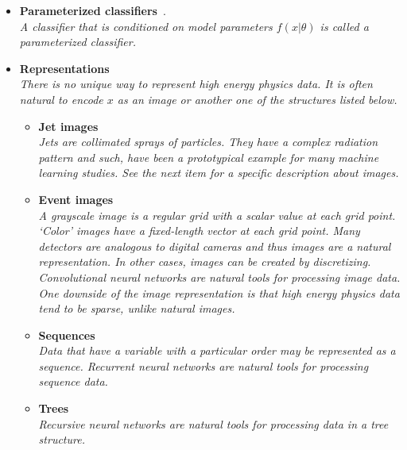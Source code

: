 \documentclass[12pt,letterpaper]{article}
\begin{document}
\begin{itemize}
	\begin{itemize}
		\item \textbf{Parameterized classifiers}~\cite{Baldi:2016fzo,Cranmer:2015bka,Nachman:2021yvi}.
			\\\textit{A classifier that is conditioned on model parameters $f(x|\theta)$ is called a parameterized classifier.}
		\item \textbf{Representations}
			\\\textit{There is no unique way to represent high energy physics data.  It is often natural to encode $x$ as an image or another one of the structures listed below.}
			\begin{itemize}
				\item \textbf{Jet images}~\cite{Pumplin:1991kc,Cogan:2014oua,Almeida:2015jua,deOliveira:2015xxd,ATL-PHYS-PUB-2017-017,Lin:2018cin,Komiske:2018oaa,Barnard:2016qma,Komiske:2016rsd,Kasieczka:2017nvn,Macaluso:2018tck,li2020reconstructing,li2020attention,Lee:2019cad,collado2021learning,Du:2020pmp,Filipek:2021qbe}
				\\\textit{Jets are collimated sprays of particles.  They have a complex radiation pattern and such, have been a prototypical example for many machine learning studies.  See the next item for a specific description about images.}
				\item \textbf{Event images}~\cite{Nguyen:2018ugw,ATL-PHYS-PUB-2019-028,Lin:2018cin,Andrews:2018nwy,Chung:2020ysf,Du:2019civ,Andrews:2021ejw,Pol:2021iqw}
				\\\textit{A grayscale image is a regular grid with a scalar value at each grid point.  `Color' images have a fixed-length vector at each grid point.  Many detectors are analogous to digital cameras and thus images are a natural representation.  In other cases, images can be created by discretizing.   Convolutional neural networks are natural tools for processing image data.  One downside of the image representation is that high energy physics data tend to be sparse, unlike natural images.}
				\item \textbf{Sequences}~\cite{Guest:2016iqz,Nguyen:2018ugw,Bols:2020bkb,goto2021development,deLima:2021fwm,ATL-PHYS-PUB-2017-003}
				\\\textit{Data that have a variable with a particular order may be represented as a sequence.  Recurrent neural networks are natural tools for processing sequence data. }
				\item \textbf{Trees}~\cite{Louppe:2017ipp,Cheng:2017rdo}
				\\\textit{Recursive neural networks are natural tools for processing data in a tree structure.}

\end{itemize}
\end{itemize}
\end{itemize}
\end{document}
